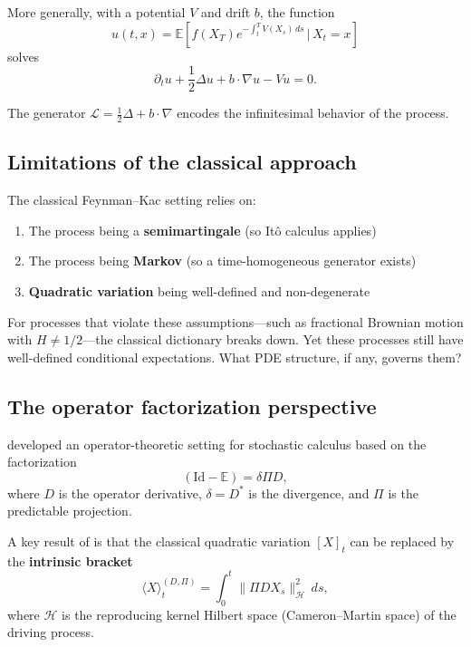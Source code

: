 \documentclass[11pt]{article}
\theoremstyle{definition}
\newcommand{\E}{\mathbb{E}}
\newcommand{\Hi}{\mathcal{H}}
\newcommand{\Id}{\mathrm{Id}}
\begin{document}
More generally, with a potential $V$ and drift $b$, the function
\begin{equation}
u(t,x) = \E\left[f(X_T) e^{-\int_t^T V(X_s)\,ds} \,\Big|\, X_t = x\right]
\end{equation}
solves
\begin{equation}
\partial_t u + \frac{1}{2}\Delta u + b \cdot \nabla u - Vu = 0.
\end{equation}

The generator $\mathcal{L} = \frac{1}{2}\Delta + b \cdot \nabla$ encodes the infinitesimal behavior of the process.

\subsection{Limitations of the classical approach}

The classical Feynman--Kac setting relies on:
\begin{enumerate}
\item The process being a \textbf{semimartingale} (so Itô calculus applies)
\item The process being \textbf{Markov} (so a time-homogeneous generator exists)
\item \textbf{Quadratic variation} being well-defined and non-degenerate
\end{enumerate}

For processes that violate these assumptions---such as fractional Brownian motion with $H \neq 1/2$---the classical dictionary breaks down. Yet these processes still have well-defined conditional expectations. What PDE structure, if any, governs them?

\subsection{The operator factorization perspective}

\cite{PaperI,PaperII,PaperIII,PaperIV,PaperV} developed an operator-theoretic setting for stochastic calculus based on the factorization
\begin{equation}\label{eq:factorization}
(\Id - \E) = \delta \Pi D,
\end{equation}
where $D$ is the operator derivative, $\delta = D^*$ is the divergence, and $\Pi$ is the predictable projection.

A key result of \cite{PaperIII} is that the classical quadratic variation $[X]_t$ can be replaced by the \textbf{intrinsic bracket}
\begin{equation}\label{eq:qv-replacement}
\langle X \rangle^{(D,\Pi)}_t = \int_0^t \|\Pi D X_s\|^2_{\Hi}\,ds,
\end{equation}
where $\Hi$ is the reproducing kernel Hilbert space (Cameron--Martin space) of the driving process.
\end{document}
